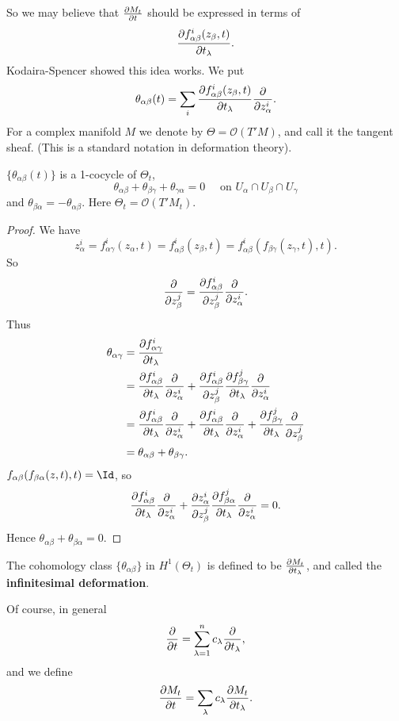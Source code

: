\documentclass[12pt]{article}
\begin{document}
So we may believe that \(\pdv{M_t}{t}\) should be expressed in terms of \[
  \pdv{f_{\alpha\beta}^i(z_\beta,t)}{t_\lambda}
.\] Kodaira-Spencer showed this idea works. We put \[
  \theta_{\alpha\beta}(t)=\sum_i\pdv{f_{\alpha\beta}^i(z_\beta,t)}{t_\lambda}
  \pdv{}{z_\alpha^i}
.\] For a complex manifold \(M\) we denote by \(\Theta=\mathcal{O}(T'M)\), and
call it the tangent sheaf. (This is a standard notation in deformation theory).

\begin{lemma}
\(\{\theta_{\alpha\beta}(t)\}\) is a 1-cocycle of \(\Theta_t\), \ie\ \[
  \theta_{\alpha\beta}+\theta_{\beta\gamma}+\theta_{\gamma\alpha}=0\quad
  \text{ on }U_\alpha\cap U_\beta\cap U_\gamma
\] and \(\theta_{\beta\alpha}=-\theta_{\alpha\beta}\). Here \(\Theta_t=
\mathcal{O}(T'M_t)\).
\end{lemma}
\begin{proof}
  We have \[
    z_\alpha^i=f_{\alpha\gamma}^i(z_\alpha,t)=f_{\alpha\beta}^i(z_\beta,t)
    =f_{\alpha\beta}^i(f_{\beta\gamma}(z_\gamma,t),t)
  .\] So \[
    \pdv{}{z_\beta^j}=\pdv{f_{\alpha\beta}^i}{z_\beta^j}\pdv{}{z_\alpha^i}
  .\] Thus
  \begin{align*}
    \theta_{\alpha\gamma}&=\pdv{f_{\alpha\gamma}^i}{t_\lambda} \\
    &=\pdv{f_{\alpha\beta}^i}{t_\lambda}\pdv{}{z_\alpha^i}+\pdv{f_{\alpha\beta}^i}
    {z_\beta^j}\pdv{f_{\beta\gamma}^j}{t_\lambda}\pdv{}{z_\alpha^i} \\
    &=\pdv{f_{\alpha\beta}^i}{t_\lambda}\pdv{}{z_\alpha^i}
    +\pdv{f_{\alpha\beta}^i}{t_\lambda}\pdv{}{z_\alpha^i}
    +\pdv{f_{\beta\gamma}^j}{t_\lambda}\pdv{}{z_\beta^j} \\
    &=\theta_{\alpha\beta}+\theta_{\beta\gamma}
  .\end{align*}
  \(f_{\alpha\beta}(f_{\beta\alpha}(z,t),t)=\Id\), so \[
    \pdv{f_{\alpha\beta}^i}{t_\lambda}\pdv{}{z_\alpha^i}+\pdv{z_\alpha^i}{z_\beta^j}
    \pdv{f_{\beta\alpha}^j}{t_\lambda}\pdv{}{z_\alpha^i}=0
  .\] Hence \(\theta_{\alpha\beta}+\theta_{\beta\alpha}=0\).
\end{proof}

\begin{definition}
  The cohomology class \(\{\theta_{\alpha\beta}\}\) in \(H^1(\Theta_t)\) is
  defined to be \(\pdv{M_t}{t_\lambda}\), and called the \textbf{infinitesimal
  deformation}.

  Of course, in general \[
    \pdv{}{t}=\sum_{\lambda=1}^{n}c_\lambda\pdv{}{t_\lambda}
  ,\] and we define \[
    \pdv{M_t}{t}=\sum_{\lambda}c_\lambda\pdv{M_t}{t_\lambda}
  .\] 
\end{definition}
\end{document}
